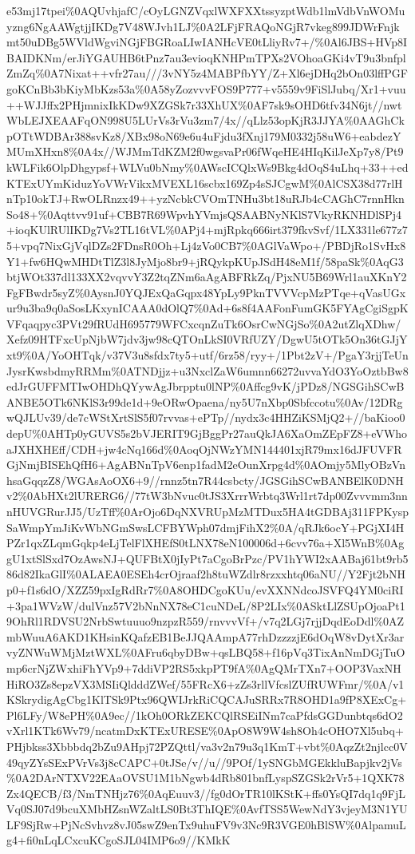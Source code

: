 \documentclass[]{article}
\begin{document}
e53mj17tpei\%0AQUvhjafC/cOyLGNZVqxlWXFXXtssyzptWdb1lmVdbVnWOMuyzng6NgAAWgtjjIKDg7V48WJvh1LJ\%0A2LFjFRAQoNGjR7vkeg899JDWrFnjkmt50uDBg5WVldWgviNGjFBGRoaLIwIANHcVE0tLliyRv7+/\%0Al6JBS+HVp8IBAIDKNm/erJiYGAUHB6tPnz7au3evioqKNHPmTPXs2VOhoaGKi4vT9u3bnfplZmZq\%0A7Nixat++vfr27au///3vNY5z4MABPfbYY/Z+Xl6ejDHq2bOn03lffPGFgoKCnBb3bKiyMbKzs53a\%0A58yZozvvvFOS9P777+v5559v9FiSlJubq/Xr1+vuu++WJJffx2PHjmnixIkKDw9XZGSk7r33XhUX\%0AF7sk9sOHD6tfv34N6jt//nwtWbLEJXEAAFqON998U5LUrVs3rVu3zm7/4x//qLlz53opKjR3JJYA\%0AAGhCkpOTtWDBAr388svKz8/XBx98oN69e6u4uFjdu3fXnj179M0332j58uW6+eabdezYMUmXHxn8\%0A4x//WJMmTdKZM2f0wgsvaPr06fWqeHE4HIqKilJeXp7y8/Pt9kWLFik6OlpDhgypsf+WLVu0bNmy\%0AWscICQlxWs9Bkg4dOqS4uLhq+33++edKTExUYmKiduzYoVWrVikxMVEXL16scbx169Zp4sSJCgwM\%0AlCSX38d77rlHnTp10okTJ+RwOLRnzx49++yzNcbkCVOmTNHu3bt18uRJb4cCAGhC7rnnHknSo48+\%0Aqttvv91uf+CBB7R69WpvhYVmjsQSAABNyNKlS7VkyRKNHDlSPj4+ioqKUlRUlIKDg7Vs2TL16tVL\%0APj4+mjRpkq666irt379fkvSvf/1LX331le677z75+vpq7NixGjVqlDZs2FDnsR0Oh+Lj4zVo0CB7\%0AGlVaWpo+/PBDjRo1SvHx8Y1+fw6HQwMHDtTlZ3l8JyMjo8br9+jRQykpKUpJSdH48eM1f/58paSk\%0AqG3btjWOt337dl133XX2vqvvY3Z2tqZNm6aAgABFRkZq/PjxNU5B69Wrl1auXKnY2FgFBwdr5syZ\%0AysnJ0YQJExQaGqpx48YpLy9PknTVVVcpMzPTqe+qVasUGxur9u3ba9q0aSosLKxynICAAA0dOlQ7\%0Ad+6s8f4AAFonFumGK5FYAgCgiSgpKVFqaqpyc3PVt29fRUdH695779WFCxcqnZuTk6OsrCwNGjSo\%0A2utZlqXDhw/Xefz09HTFxcUpNjbW7jdv3jw98cQTOnLkSI0VRfUZY/DgwU5tOTk5On36tGJjYxt9\%0A/YoOHTqk/v37V3u8sfdx7ty5+utf/6rz58/ryy+/1Pbt2zV+/PgaY3rjjTeUnJysrKwsbdmyRRMm\%0ATNDjjz+u3NxclZaW6umnn66272uvvaYdO3YoOztbBw8edJrGUFFMTIwOHDhQYywAgJbrpptu0lNP\%0Affcg9vK/jPDz8/NGSGihSCwBANBE5OTk6NKlS3r99de1d+9eORwOpaena/ny5U7nXbp0Sbfccotu\%0Av/12DRgwQJLUv39/de7cWStXrtSlS5f07rvvas+ePTp//nydx3c4HHZiKSMjQ2+//baKioo0depU\%0AHTp0yGUVS5s2bVJERIT9GjBggPr27auQkJA6XaOmZEpFZ8+eVWhoaJXHXHEff/CDH+jw4cNq166d\%0AoqOjNWzYMN144401xjR79mx16dJFUVFRGjNmjBISEhQfH6+AgABNnTpV6enp1fadM2eOunXrpg4d\%0AOmjy5MlyOBzVnhsaGqqzZ8/WGAsAoOX6+9//rnnz5tn7R44csbcty/JGSGihSCwBANBElK0DNHv2\%0AbHXt2lURERG6//77tW3bNvuc0tJS3XrrrWrbtq3Wrl1rt7dp00Zvvvmm3nnnHUVGRurJJ5/UzTff\%0ArOjo6DqNXVRUpMzMTDux5HA4tGDBAj311FPKyspSaWmpYmJiKvWbNGmSwsLCFBYWph07dmjFihX2\%0A/qRJk6ocY+PGjXI4HPZr1qxZLqmGqkp4eLjTelFlXHEfS0tLNX78eN100006d+6cvv76a+Xl5WnB\%0AggU1xtSlSxd7OzAwsNJ+QUFBtX0jIyPt7aCgoBrPzc/PV1hYWI2xAABaj61bt9rb586d82IkaGlI\%0ALAEA0ESEh4crOjraaf2h8tuWZdlr8rzxxhtq06aNU//Y2Fjt2bNHp0+f1s6dO/XZZ59pxIgRdRr7\%0A8OHDCgoKUu/evXXNNdcoJSVFQ4YM0ciRI+3pa1WVzW/dulVnz57V2bNnNX78eC1cuNDeL/8P2LIx\%0ASktLlZSUpOjoaPt19OhRl1RDVSU2NrbSwtuuuo9nzpzR559/rnvvvVf+/v7q2LGj7rjjDqdEoDdl\%0AZmbWuuA6AKD1KHsinKQafzEB1BeJJQAAmpA77rhDzzzzjE6dOqW8vDytXr3arvyZNWuWMjMztWXL\%0AFru6qbyDBw+qsLBQ58+f16pVq3TixAnNmDGjTuOmp6crNjZWxhiFhYVp9+7ddiVP2RS5xkpPT9fA\%0AgQMrTXn7+OOP3VaxNHHiRO3Zs8epzVX3MSIiQldddZWef/55FRcX6+zZs3rllVfcslZUfRUWFmr/\%0A/v1KSkrydigAgCbg1KlTSk9Ptx96QWIJrkRiCQCAJuSRRx7R8OHD1a9fP8XExCg+Pl6LFy/W8ePH\%0A9ec//1kOh0ORkZEKCQlRSEiINm7caPfdsGGDunbtqs6dO2vXrl1KTk6Wv79/ncatmDxKTExURESE\%0ApO8W9W4sh8Oh4cOHO7Xl5ubq+PHjbkss3Xbbbdq2bZu9AHpj72PZQttl/va3v2n79u3q1KmT+vbt\%0AqzZt2njlcc0V49qyZYsSExPVrVs3j8cCAPC+0tJSe/v//u//9POf/1ySNGbMGEkkluBapjkv2jVs\%0A2DArNTXV22EAaOVSU1M1bNgwb4dRb801bnfLyspSZGSk2rVr5+1QXK78Zx4QECB/f3/NmTNHjz76\%0AqEuuv3//fg0dOrTR10lKStK+ffs0YsQI7dq1q9FjLVq0SJ07d9bcuXMbHZsnWZaltLS0Bt3ThIQE\%0AvfTSS5WewNdY3vjeyM3N1YULF9SjRw+PjNcSvhvz8vJ05swZ9enTx9uhuFV9v3Nc9R3VGE0hBlSW\%0AlpamuLg4+fi0nLqLCxcuKCgoSJL04IMP6o9//KMkK
\end{document}
